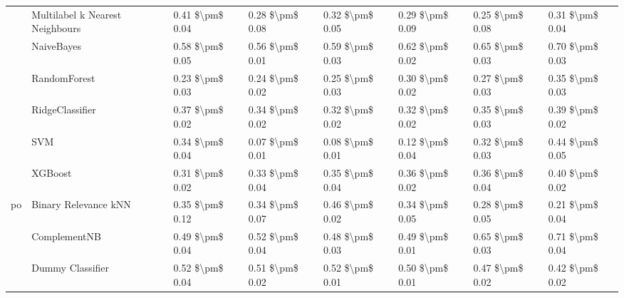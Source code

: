 \begin{tabular}{llllllll}
   & Multilabel k Nearest Neighbours &      0.41 \$\textbackslash pm\$ 0.04 &           0.28 \$\textbackslash pm\$ 0.08 &       0.32 \$\textbackslash pm\$ 0.05 &        0.29 \$\textbackslash pm\$ 0.09 &                         0.25 \$\textbackslash pm\$ 0.08 &      0.31 \$\textbackslash pm\$ 0.04 \\
   & NaiveBayes &      0.58 \$\textbackslash pm\$ 0.05 &           0.56 \$\textbackslash pm\$ 0.01 &       0.59 \$\textbackslash pm\$ 0.03 &        0.62 \$\textbackslash pm\$ 0.02 &                         0.65 \$\textbackslash pm\$ 0.03 &      0.70 \$\textbackslash pm\$ 0.03 \\
   & RandomForest &      0.23 \$\textbackslash pm\$ 0.03 &           0.24 \$\textbackslash pm\$ 0.02 &       0.25 \$\textbackslash pm\$ 0.03 &        0.30 \$\textbackslash pm\$ 0.02 &                         0.27 \$\textbackslash pm\$ 0.03 &      0.35 \$\textbackslash pm\$ 0.03 \\
   & RidgeClassifier &      0.37 \$\textbackslash pm\$ 0.02 &           0.34 \$\textbackslash pm\$ 0.02 &       0.32 \$\textbackslash pm\$ 0.02 &        0.32 \$\textbackslash pm\$ 0.02 &                         0.35 \$\textbackslash pm\$ 0.03 &      0.39 \$\textbackslash pm\$ 0.02 \\
   & SVM &      0.34 \$\textbackslash pm\$ 0.04 &           0.07 \$\textbackslash pm\$ 0.01 &       0.08 \$\textbackslash pm\$ 0.01 &        0.12 \$\textbackslash pm\$ 0.04 &                         0.32 \$\textbackslash pm\$ 0.03 &      0.44 \$\textbackslash pm\$ 0.05 \\
   & XGBoost &      0.31 \$\textbackslash pm\$ 0.02 &           0.33 \$\textbackslash pm\$ 0.04 &       0.35 \$\textbackslash pm\$ 0.04 &        0.36 \$\textbackslash pm\$ 0.02 &                         0.36 \$\textbackslash pm\$ 0.04 &      0.40 \$\textbackslash pm\$ 0.02 \\
po & Binary Relevance kNN &      0.35 \$\textbackslash pm\$ 0.12 &           0.34 \$\textbackslash pm\$ 0.07 &       0.46 \$\textbackslash pm\$ 0.02 &        0.34 \$\textbackslash pm\$ 0.05 &                         0.28 \$\textbackslash pm\$ 0.05 &      0.21 \$\textbackslash pm\$ 0.04 \\
   & ComplementNB &      0.49 \$\textbackslash pm\$ 0.04 &           0.52 \$\textbackslash pm\$ 0.04 &       0.48 \$\textbackslash pm\$ 0.03 &        0.49 \$\textbackslash pm\$ 0.01 &                         0.65 \$\textbackslash pm\$ 0.03 &      0.71 \$\textbackslash pm\$ 0.04 \\
   & Dummy Classifier &      0.52 \$\textbackslash pm\$ 0.04 &           0.51 \$\textbackslash pm\$ 0.02 &       0.52 \$\textbackslash pm\$ 0.01 &        0.50 \$\textbackslash pm\$ 0.01 &                         0.47 \$\textbackslash pm\$ 0.02 &      0.42 \$\textbackslash pm\$ 0.02 \\

\end{tabular}
